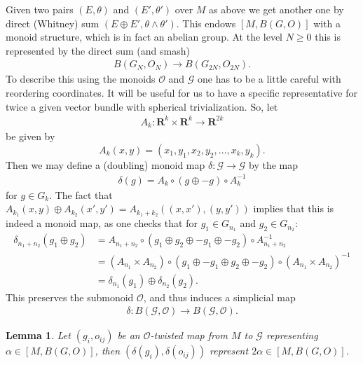 \documentclass[reqno]{amsart}
\theoremstyle{theorem}
\newtheorem{lemma}[corollary]{Lemma}
\theoremstyle{remark}
\theoremstyle{definition}
\newcommand{\R}{\mathbf{R}}
\newcommand{\GG}{\mathcal{G}}
\newcommand{\OO}{\mathcal{O}}
\begin{document}
Given two pairs $(E,\theta)$ and $(E',\theta')$ over $M$ as above we get another one by direct (Whitney) sum
$(E\oplus E', \theta \wedge \theta')$. This endows $[M,B(G,O)]$ with a monoid structure,
which is in fact an abelian group. At the level $N\geq 0$ this is represented by the direct sum (and smash)
\begin{align*}
  B(G_N,O_N) \to B(G_{2N},O_{2N}).
\end{align*}
To describe this using the monoids $\OO$ and $\GG$ one has to be a little careful with reordering coordinates. %
It will be useful for us to have a specific representative for twice a given vector bundle with spherical trivialization. So, let
\begin{align*}
  A_k: \R^k \times \R^k \to \R^{2k}
\end{align*}
be given by 
\[A_k(x,y) = (x_1,y_1,x_2,y_2,\dots,x_k,y_k).\]
Then we may define a (doubling) monoid map $\delta : \GG \to \GG$ by the map
\begin{align*}
  \delta(g) = A_k \circ (g\oplus -g) \circ A_k^{-1}
\end{align*}
for $g\in G_k$. The fact that $A_{k_1}(x,y) \oplus A_{k_2}(x',y') = A_{k_1 + k_2}((x,x'),(y,y'))$ implies that this is indeed a monoid map, as one checks that for $g_1\in G_{n_1}$ and $g_2\in G_{n_2}$:
\begin{align*}
\delta_{n_1+n_2}(g_1 \oplus g_2) &= A_{n_1+n_2}\circ (g_1 \oplus g_2 \oplus -g_1 \oplus -g_2 ) \circ A_{n_1+n_2}^{-1} \\
&= (A_{n_1}\times A_{n_2}) \circ (g_1 \oplus -g_1 \oplus g_2 \oplus -g_2) \circ (A_{n_1} \times A_{n_2} )^{-1} \\
&= \delta_{n_1}(g_1) \oplus \delta_{n_2}(g_2).
\end{align*}
This preserves the submonoid $\OO$, and thus induces a simplicial map
\begin{align*}
  \delta : B(\GG,\OO) \to B(\GG,\OO).
\end{align*}




\begin{lemma}\label{lem:twice}
Let $(g_i,o_{ij})$ be an $\OO$-twisted map from $M$ to $\GG$ representing
$\alpha\in [M,B(G,O)]$, then $(\delta (g_i), \delta (o_{ij}))$ represent $2\alpha \in [M,B(G,O)]$.
\end{lemma}
\end{document}
